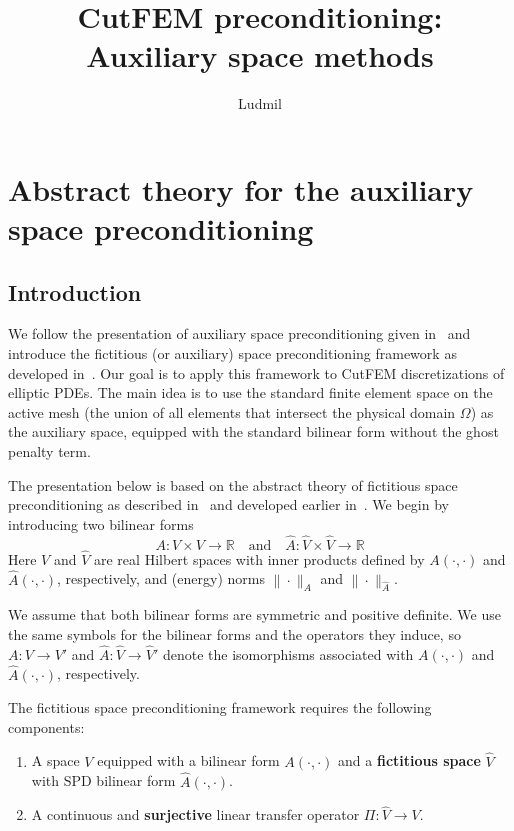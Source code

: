 \documentclass[11pt]{article}
\title{CutFEM preconditioning: Auxiliary space methods}
\author{Ludmil}
\date{}
\theoremstyle{remark}
\begin{document}
\maketitle

\tableofcontents
\section{Abstract theory for the auxiliary space preconditioning}
\subsection{Introduction}
We follow the presentation of auxiliary space preconditioning
given in~\cite{HiptmairXu2007} and introduce the fictitious (or auxiliary) space preconditioning framework as developed
in~\cite{Nepomnyaschikh1992,Xu1996,HiptmairXu2007}.
Our goal is to apply this framework to CutFEM discretizations of elliptic PDEs. The main idea is to use the standard finite element space on the active mesh (the union of all elements that intersect the physical domain $\Omega$) as the auxiliary space, equipped with the standard bilinear form without the ghost penalty term.

The presentation below is based on the abstract theory of fictitious space preconditioning as described in~\cite{HiptmairXu2007} and developed earlier in~\cite{Nepomnyaschikh1992,Xu1996}.
\setcounter{equation}{0}
We begin by introducing two bilinear forms
\begin{equation*}
  A:V\times V \to \mathbb{R}\quad\mbox{and}\quad \widehat{A}:\widehat{V}\times\widehat{V} \to \mathbb{R}
\end{equation*}
Here $V$ and $\widehat{V}$ are real Hilbert spaces with inner products
defined by
$A(\cdot,\cdot)$ and $\widehat{A}(\cdot,\cdot)$,
respectively, and (energy) norms
$\|\cdot\|_A$ and $\|\cdot\|_{\widehat{A}}$.

We assume that both bilinear forms are symmetric and positive definite. We use the same symbols for the bilinear forms and the operators they induce, so $A:V\to V'$ and $\widehat{A}:\widehat{V}\to \widehat{V}'$ denote the isomorphisms associated with $A(\cdot,\cdot)$ and $\widehat{A}(\cdot,\cdot)$, respectively.

The fictitious space preconditioning framework requires the following components:
\begin{enumerate}
\item A space $V$ equipped with a bilinear form $A(\cdot,\cdot)$ and
a  {\bf fictitious space} $\widehat{V}$ with SPD bilinear form $\widehat{A}(\cdot,\cdot)$.
  \item A continuous and {\bf surjective} linear transfer operator
    $\Pi : \widehat{V} \to V$.
\end{enumerate}
\end{document}
